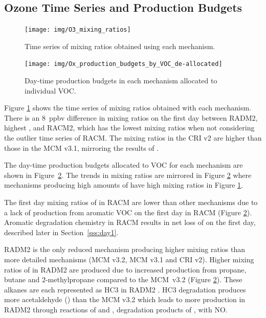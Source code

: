 %
\subsection[O3 Time Series and Ox Production Budgets]{Ozone Time Series and  Production Budgets} \label{ss:O3_time_series}
%
\begin{figure}
    \centering
    \texttt{[image: img/O3\_mixing\_ratios]}
    \vspace{0mm}
    \caption{Time series of  mixing ratios obtained using each mechanism.}
    \vspace{-4mm}
    \label{f:time_series}
\end{figure}
%
\begin{figure}
    \centering
    \texttt{[image: img/Ox\_production\_budgets\_by\_VOC\_de-allocated]}
    \vspace{1mm}
    \caption{Day-time  production budgets in each mechanism allocated to individual VOC.}
    \vspace{-4mm}
    \label{f:Ox_tagged_budgets}
\end{figure}
%
Figure \ref{f:time_series} shows the time series of  mixing ratios obtained with each mechanism.
There is an \mbox{$8$ ppbv} difference in  mixing ratios on the first day between RADM2, highest , and RACM2, which has the lowest  mixing ratios when not considering the outlier time series of RACM.
The  mixing ratios in the CRI v2 are higher than those in the MCM v3.1, mirroring the results of \citet{Jenkin:2008}.

The day-time  production budgets allocated to VOC for each mechanism are shown in \mbox{Figure \ref{f:Ox_tagged_budgets}}.
The trends in  mixing ratios are mirrored in Figure \ref{f:Ox_tagged_budgets} where mechanisms producing high amounts of  have high  mixing ratios in Figure \ref{f:time_series}.

The first day mixing ratios of  in RACM are lower than other mechanisms due to a lack of  production from aromatic VOC on the first day in RACM (Figure \ref{f:Ox_tagged_budgets}).
Aromatic degradation chemistry in RACM results in net loss of  on the first day, described later in \mbox{Section \ref{sss:day1}}.

RADM2 is the only reduced mechanism producing higher  mixing ratios than more detailed mechanisms (MCM v3.2, MCM v3.1 and CRI v2).
Higher mixing ratios of  in RADM2 are produced due to increased  production from propane, butane and $2$-methylpropane compared to the \mbox{MCM v3.2} (Figure \ref{f:Ox_tagged_budgets}).
These alkanes are each represented as HC3 in RADM2 \citep{Stockwell:1990}.
HC3 degradation produces more acetaldehyde () than the MCM v3.2 which leads to more  production in RADM2 through reactions of  and , degradation products of , with NO. 
%
